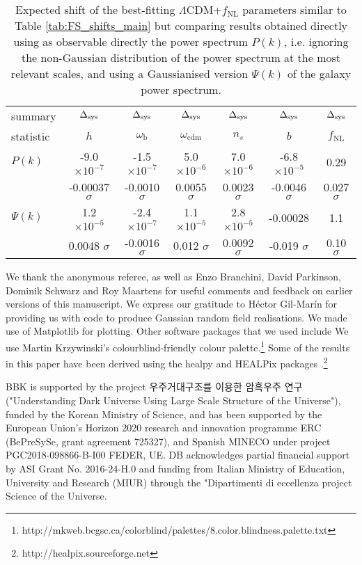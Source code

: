 \documentclass[a4paper,11pt]{article}
\begin{document}
\begin{table}[ht]
    \centering
    \begin{tabular}{|l|c|c|c|c|c|c|}
      \hline summary &  $\Delta_{\rm sys}$&$\Delta_{\rm sys}$&$\Delta_{\rm sys}$&$\Delta_{\rm sys}$&$\Delta_{\rm sys}$&$\Delta_{\rm sys}$\\
          statistic & $h$ & $\omega_\mathrm{b}$ & $\omega_\mathrm{cdm}$ & $n_s$ & $b$ & $f_\mathrm{NL}$ \\\hline\hline
         $P(k)$  &  -9.0$\times 10^{-7}$
 &  -1.5$\times 10^{-7}$
 &  5.0$\times 10^{-6}$
 &  7.0$\times 10^{-6}$
 &  -6.8$\times 10^{-5}$
 &  0.29\\
         &  -0.00037 $\sigma$
 &  -0.0010 $\sigma$
 &  0.0055 $\sigma$
 &  0.0023 $\sigma$
 &  -0.0046 $\sigma$
 &  0.027 $\sigma$\\
         $\Psi(k)$ &  1.2$\times 10^{-5}$
 &  -2.4$\times 10^{-7}$
 &  1.1$\times 10^{-5}$
 &  2.8$\times 10^{-5}$
 &  -0.00028
 &  1.1
\\
          & 0.0048 $\sigma$
 &  -0.0016 $\sigma$
 &  0.012 $\sigma$
 &  0.0092 $\sigma$
 &  -0.019 $\sigma$
 &  0.10 $\sigma$\\\hline
    \end{tabular}
    \caption{Expected shift of the best-fitting $\Lambda$CDM+$f_\mathrm{NL}$ parameters similar to Table \ref{tab:FS_shifts_main} but comparing results obtained directly using as observable directly the power spectrum $P(k)$, i.e. ignoring the non-Gaussian distribution of the power spectrum at the most relevant scales, and using a Gaussianised version $\Psi(k)$ of the galaxy power spectrum.}
    \label{tab:FS_shifts_G_vs_nG}
\end{table}




\acknowledgments
We thank the anonymous referee, as well as Enzo Branchini, David Parkinson, Dominik Schwarz and Roy Maartens for useful comments and feedback  on earlier versions of this manuscript. We express our gratitude to H\'ector Gil-Mar\'in for providing us with code to produce Gaussian random field realisations. We made use of Matplotlib \cite{Hunter:2007} for plotting. Other software packages that we used include  We use Martin Krzywinski's colourblind-friendly colour palette.\footnote{http://mkweb.bcgsc.ca/colorblind/palettes/8.color.blindness.palette.txt} Some of the results in this paper have been derived using the healpy and HEALPix packages \cite{Gorski:2004by,Zonca2019}.\footnote{http://healpix.sourceforge.net} 

BBK is supported by
the project 우주거대구조를 이용한 암흑우주 연구 ("Understanding
Dark Universe Using Large Scale Structure of
the Universe"), funded by the Korean Ministry of Science, and has been supported by the European Union’s
Horizon 2020 research and innovation programme ERC
(BePreSySe, grant agreement 725327), and Spanish MINECO
under project PGC2018-098866-B-I00  FEDER, UE.
DB acknowledges partial financial support by ASI Grant No. 2016-24-H.0 and funding from Italian Ministry of Education, University and Research (MIUR) through the "Dipartimenti di eccellenza project Science of the Universe.


{}
\end{document}
